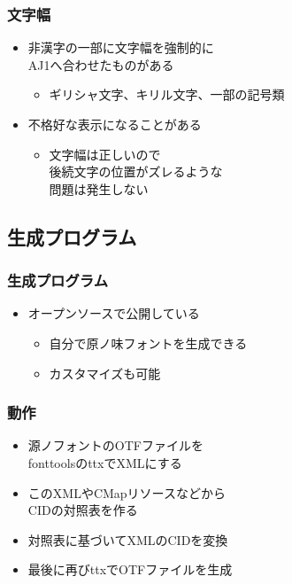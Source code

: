 \begin{frame}\frametitle{文字幅}
  \begin{itemize}
  \item 非漢字の一部に文字幅を強制的に \\
    AJ1へ合わせたものがある
    \begin{itemize}
    \item ギリシャ文字、キリル文字、一部の記号類
    \end{itemize}
  \item 不格好な表示になることがある
    \begin{itemize}
    \item 文字幅は正しいので \\
      後続文字の位置がズレるような \\
      問題は発生しない
    \end{itemize}
  \end{itemize}
\end{frame}

\subsection{生成プログラム}
\begin{frame}\frametitle{生成プログラム}
  \begin{itemize}
  \item オープンソースで公開している
    \begin{itemize}
      \item 自分で原ノ味フォントを生成できる
      \item カスタマイズも可能
    \end{itemize}
  \end{itemize}
\end{frame}

\begin{frame}\frametitle{動作}
  \begin{itemize}
  \item 源ノフォントのOTFファイルを \\
    fonttoolsのttxでXMLにする
  \item このXMLやCMapリソースなどから \\
    CIDの対照表を作る
  \item 対照表に基づいてXMLのCIDを変換
  \item 最後に再びttxでOTFファイルを生成
  \end{itemize}
\end{frame}

